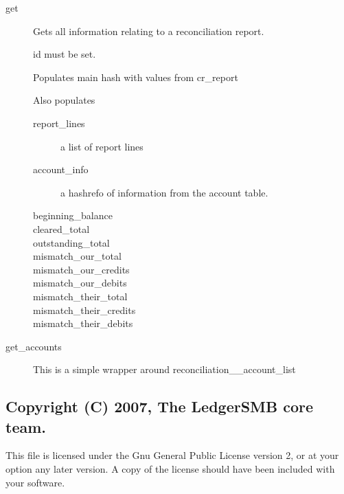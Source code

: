 \begin{description}
\begin{description}
\begin{description}
\begin{description}
\begin{description}
\begin{description}
\begin{description}
\begin{description}
\begin{description}
\begin{description}
\item[{get}] \mbox{}

Gets all information relating to a reconciliation report.



id must be set.



Populates main hash with values from cr\_report



Also populates

\begin{description}

\item[{report\_lines}] \mbox{}

a list of report lines


\item[{account\_info}] \mbox{}

a hashrefo of information from the account table.


\item[{beginning\_balance}] \mbox{}
\item[{cleared\_total}] \mbox{}
\item[{outstanding\_total}] \mbox{}
\item[{mismatch\_our\_total}] \mbox{}
\item[{mismatch\_our\_credits}] \mbox{}
\item[{mismatch\_our\_debits}] \mbox{}
\item[{mismatch\_their\_total}] \mbox{}
\item[{mismatch\_their\_credits}] \mbox{}
\item[{mismatch\_their\_debits}] \mbox{}\end{description}

\item[{get\_accounts}] \mbox{}

This is a simple wrapper around reconciliation\_\_account\_list

\end{description}
\subsection*{Copyright (C) 2007, The LedgerSMB core team.\label{LedgerSMB::DBObject::Reconciliation_Copyright_C_2007_The_LedgerSMB_core_team_}}


This file is licensed under the Gnu General Public License version 2, or at your
option any later version.  A copy of the license should have been included with
your software.


\end{description}
\end{description}
\end{description}
\end{description}
\end{description}
\end{description}
\end{description}
\end{description}
\end{description}
